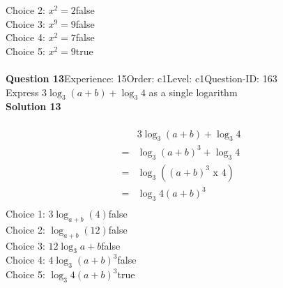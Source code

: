 \documentclass{article}
\begin{document}
Choice 2: \hspace{20pt}$x^2=2$\hspace{20pt}false\\
Choice 3: \hspace{20pt}$x^9=9$\hspace{20pt}false\\
Choice 4: \hspace{20pt}$x^2=7$\hspace{20pt}false\\
Choice 5: \hspace{20pt}$x^2=9$\hspace{20pt}true\\
\\[4pt]
\noindent\textbf{Question 13}\hspace{20pt}Experience: 15\hspace{20pt}Order: c1\hspace{20pt}Level: c1\hspace{20pt}Question-ID: 163\\[2pt]
Express $3\log_{3}(a+b)+\log_{3}4$ as a single logarithm\\[4pt]
\noindent\textbf{Solution 13}\\[2pt]
\\[-35pt]\begin{align*}
&3\log_{3}(a+b)+\log_{3}4\\[2pt]
=&\log_{3}(a+b)^3+\log_{3}4\\[2pt]
=&\log_{3}((a+b)^3 \,\, \text{x} \,\, 4)\\[2pt]
=&\log_{3}4(a+b)^3\\[-80pt]
\end{align*}
Choice 1: \hspace{20pt}$3\log_{a+b}(4)$\hspace{20pt}false\\
Choice 2: \hspace{20pt}$\log_{a+b}(12)$\hspace{20pt}false\\
Choice 3: \hspace{20pt}$12\log_{3}a+b$\hspace{20pt}false\\
Choice 4: \hspace{20pt}$4\log_{3}(a+b)^3$\hspace{20pt}false\\
Choice 5: \hspace{20pt}$\log_{3}4(a+b)^3$\hspace{20pt}true\\
\end{document}
